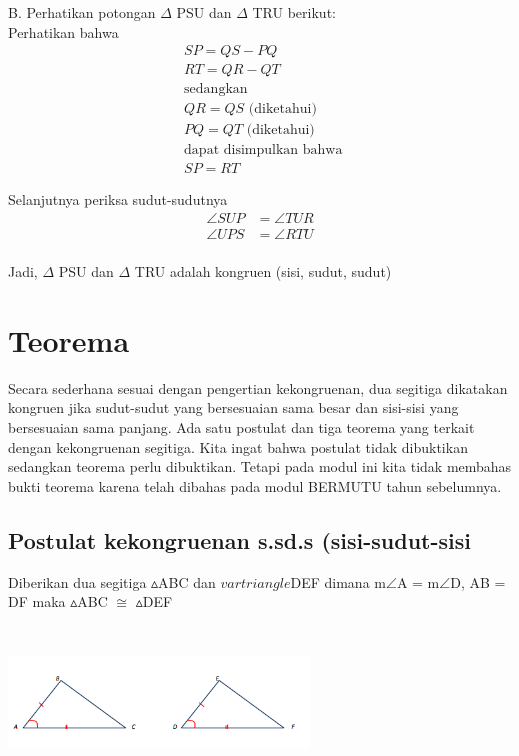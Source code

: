 \documentclass[11pt,fleqn]{book} %
\begin{document}
B. Perhatikan potongan $\Delta$ PSU dan $\Delta$ TRU berikut:\\
Perhatikan bahwa\\
    \begin{align*}  	        &SP = QS - PQ \\  		&RT = QR - QT \\  		&\text{sedangkan} \\                 &QR = QS \text{ (diketahui)}\\  		&PQ = QT \text{ (diketahui)}\\                 &\text{dapat disimpulkan bahwa } \\                 &SP = RT 	     \end{align*}

Selanjutnya periksa sudut-sudutnya\\
    \begin{align*}                 \angle SUP &= \angle TUR \\                 \angle UPS &= \angle RTU \\              \end{align*}

Jadi, $\Delta$ PSU dan $\Delta$ TRU adalah kongruen (sisi, sudut, sudut)\\


\section{Teorema}

Secara sederhana sesuai dengan pengertian kekongruenan, dua segitiga dikatakan
kongruen jika sudut-sudut yang bersesuaian sama besar dan sisi-sisi yang bersesuaian
sama panjang. Ada satu postulat dan tiga teorema yang terkait dengan kekongruenan
segitiga. Kita ingat bahwa postulat tidak dibuktikan sedangkan teorema perlu
dibuktikan. Tetapi pada modul ini kita tidak membahas bukti teorema karena telah
dibahas pada modul BERMUTU tahun sebelumnya. 

\subsection{Postulat kekongruenan s.sd.s (sisi-sudut-sisi}


\begin{theorem}

Diberikan dua segitiga $\vartriangle $ABC dan $vartriangle $DEF dimana m$\angle$A = m$\angle$D, AB = DF maka $\vartriangle $ABC $\cong$ $\vartriangle $DEF
\end{theorem}
\includegraphics[width = 8cm, height= 4cm]{Pictures/4.png}
\end{document}
